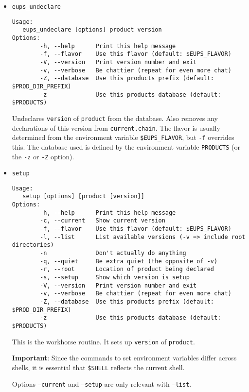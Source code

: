 \documentclass{article}
\begin{document}
\begin{itemize}
  \item \texttt{eups\_undeclare}
\begin{verbatim}
Usage:
   eups_undeclare [options] product version
Options:
        -h, --help      Print this help message
        -f, --flavor    Use this flavor (default: $EUPS_FLAVOR)
        -V, --version   Print version number and exit
        -v, --verbose   Be chattier (repeat for even more chat)
        -Z, --database  Use this products prefix (default: $PROD_DIR_PREFIX)
        -z              Use this products database (default: $PRODUCTS)
\end{verbatim}
  
Undeclares \texttt{version} of \texttt{product} from the
database. Also removes any declarations of this version from
\texttt{current.chain}. The flavor is usually determined from the
environment variable \texttt{\$EUPS\_FLAVOR}, but \texttt{-f}
overrides this. The database used is defined by the environment
variable \texttt{PRODUCTS} (or the \texttt{-z} or \texttt{-Z} option).


\item \texttt{setup}
\begin{verbatim}
Usage:
   setup [options] [product [version]]
Options:
        -h, --help      Print this help message
        -c, --current   Show current version
        -f, --flavor    Use this flavor (default: $EUPS_FLAVOR)
        -l, --list      List available versions (-v => include root directories)
        -n              Don't actually do anything
        -q, --quiet     Be extra quiet (the opposite of -v)
        -r, --root      Location of product being declared
        -s, --setup     Show which version is setup
        -V, --version   Print version number and exit
        -v, --verbose   Be chattier (repeat for even more chat)
        -Z, --database  Use this products prefix (default: $PROD_DIR_PREFIX)
        -z              Use this products database (default: $PRODUCTS)
\end{verbatim}

This is the workhorse routine. It sets up \texttt{version} of \texttt{product}.

\textbf{Important}: Since the commands to set environment variables differ across shells,
it is essential that \texttt{\$SHELL} reflects the current shell.

Options \texttt{--current} and \texttt{--setup} are only relevant with \texttt{--list}.


\end{itemize}
\end{document}
